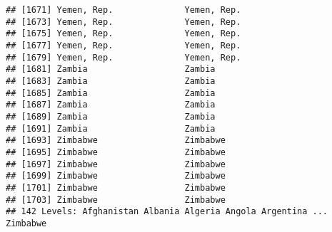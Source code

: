 \documentclass[]{article}
\newenvironment{Shaded}{\begin{snugshade}}{\end{snugshade}}
\newcommand{\KeywordTok}[1]{\textcolor[rgb]{0.13,0.29,0.53}{\textbf{#1}}}
\newcommand{\CommentTok}[1]{\textcolor[rgb]{0.56,0.35,0.01}{\textit{#1}}}
\newcommand{\OperatorTok}[1]{\textcolor[rgb]{0.81,0.36,0.00}{\textbf{#1}}}
\newcommand{\NormalTok}[1]{#1}
\begin{document}
\begin{verbatim}
## [1671] Yemen, Rep.              Yemen, Rep.             
## [1673] Yemen, Rep.              Yemen, Rep.             
## [1675] Yemen, Rep.              Yemen, Rep.             
## [1677] Yemen, Rep.              Yemen, Rep.             
## [1679] Yemen, Rep.              Yemen, Rep.             
## [1681] Zambia                   Zambia                  
## [1683] Zambia                   Zambia                  
## [1685] Zambia                   Zambia                  
## [1687] Zambia                   Zambia                  
## [1689] Zambia                   Zambia                  
## [1691] Zambia                   Zambia                  
## [1693] Zimbabwe                 Zimbabwe                
## [1695] Zimbabwe                 Zimbabwe                
## [1697] Zimbabwe                 Zimbabwe                
## [1699] Zimbabwe                 Zimbabwe                
## [1701] Zimbabwe                 Zimbabwe                
## [1703] Zimbabwe                 Zimbabwe                
## 142 Levels: Afghanistan Albania Algeria Angola Argentina ... Zimbabwe
\end{verbatim}

\begin{Shaded}
\end{Shaded}
\end{document}
